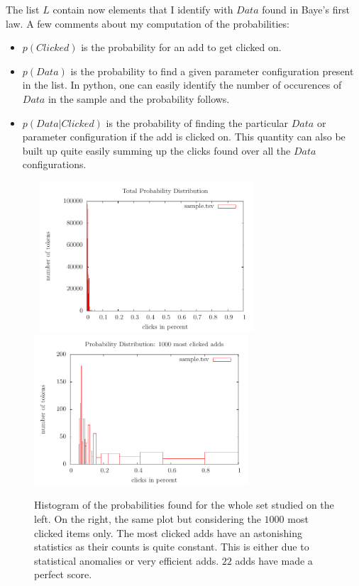 \documentclass{report}
\begin{document}
The list $L$ contain now elements that I identify with $Data$ found in Baye's first law.
A few comments about my computation of the probabilities:
\begin{itemize}
\item $p(Clicked)$ is the probability for an add to get clicked on.
\item $p(Data)$ is the probability to find a given parameter configuration present in the list.
In python, one can easily identify the number of occurences of $Data$ in the sample and the probability follows.
\item $p(Data | Clicked)$ is the probability of finding the particular $Data$ or parameter configuration if the add is clicked on.
This quantity can also be built up quite easily summing up the clicks found over all the $Data$ configurations.
\end{itemize}





\begin{figure}[h]
\hspace{-50pt}
\mbox{
\includegraphics[width=8cm]{scriptplot.pdf}
\includegraphics[width=8cm]{scriptplot3.pdf}
}
      \caption{
		Histogram of the probabilities found for the whole set studied on the left. 
		On the right, the same plot but considering the $1000$ most clicked items only.
		The most clicked adds have
		an astonishing statistics as their counts is quite constant.
		This is either due to statistical anomalies or very efficient adds. 
		$22$ adds have made a perfect score.	
              }
\label{thxalbert}
\end{figure}
\end{document}
